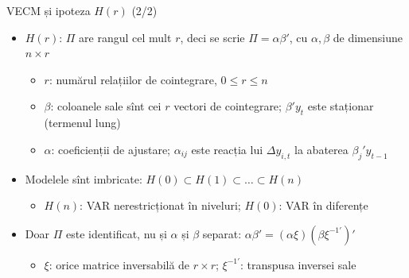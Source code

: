 \begin{frame}{VECM și ipoteza $H(r)$ (2/2)}
\itemsize{\small}
\begin{itemize}
    \item $H(r)$: $\Pi$ are rangul cel mult $r$, deci se scrie $\Pi = \alpha\beta'$, cu $\alpha, \beta$ de dimensiune $n\times r$
    \begin{itemize}
        \item $r$: numărul relațiilor de cointegrare, $0 \le r \le n$
        \item $\beta$: coloanele sale sînt cei $r$ vectori de cointegrare; $\beta'y_t$ este staționar (termenul lung)
        \item $\alpha$: coeficienții de ajustare; $\alpha_{ij}$ este reacția lui $\Delta y_{i,t}$ la abaterea $\beta_j'y_{t-1}$
    \end{itemize}
    \item Modelele sînt imbricate: $H(0) \subset H(1) \subset \dots \subset H(n)$
    \begin{itemize}
        \item $H(n)$: VAR nerestricționat în niveluri; $H(0)$: VAR în diferențe
    \end{itemize}
    \item Doar $\Pi$ este identificat, nu și $\alpha$ și $\beta$ separat: $\alpha\beta' = (\alpha\xi)(\beta\xi^{-1\prime})'$
    \begin{itemize}
        \item $\xi$: orice matrice inversabilă de $r\times r$; $\xi^{-1\prime}$: transpusa inversei sale
    \end{itemize}
\end{itemize}
\end{frame}


